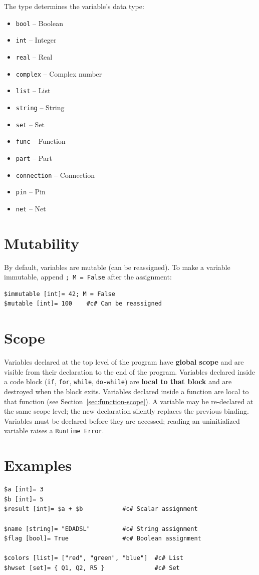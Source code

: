 The type determines the variable's data type:
\begin{itemize}
\item \texttt{bool} -- Boolean
\item \texttt{int} -- Integer
\item \texttt{real} -- Real
\item \texttt{complex} -- Complex number
\item \texttt{list} -- List
\item \texttt{string} -- String
\item \texttt{set} -- Set
\item \texttt{func} -- Function
\item \texttt{part} -- Part
\item \texttt{connection} -- Connection
\item \texttt{pin} -- Pin
\item \texttt{net} -- Net
\end{itemize}

\section{Mutability}
By default, variables are mutable (can be reassigned). To make a variable immutable, append \texttt{; M = False} after the assignment:
\begin{verbatim}
$immutable [int]= 42; M = False
$mutable [int]= 100    #c# Can be reassigned
\end{verbatim}

\section{Scope}
Variables declared at the top level of the program have \textbf{global scope} and are visible from their declaration to the end of the program. Variables declared inside a code block (\texttt{if}, \texttt{for}, \texttt{while}, \texttt{do-while}) are \textbf{local to that block} and are destroyed when the block exits. Variables declared inside a function are local to that function (see Section~\ref{sec:function-scope}). A variable may be re-declared at the same scope level; the new declaration silently replaces the previous binding. Variables must be declared before they are accessed; reading an uninitialized variable raises a \texttt{Runtime Error}.

\section{Examples}
\begin{verbatim}
$a [int]= 3
$b [int]= 5
$result [int]= $a + $b           #c# Scalar assignment

$name [string]= "EDADSL"         #c# String assignment
$flag [bool]= True               #c# Boolean assignment

$colors [list]= ["red", "green", "blue"]  #c# List
$hwset [set]= { Q1, Q2, R5 }              #c# Set
\end{verbatim}


